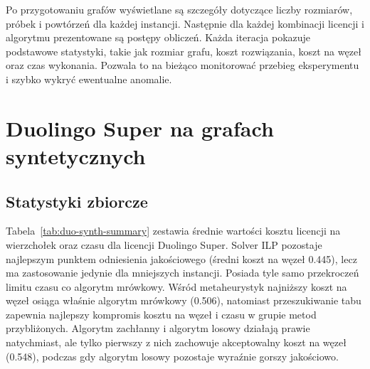 Po przygotowaniu grafów wyświetlane są szczegóły dotyczące liczby rozmiarów, próbek i powtórzeń dla każdej instancji. Następnie dla każdej kombinacji licencji i algorytmu prezentowane są postępy obliczeń. Każda iteracja pokazuje podstawowe statystyki, takie jak rozmiar grafu, koszt rozwiązania, koszt na węzeł oraz czas wykonania. Pozwala to na bieżąco monitorować przebieg eksperymentu i szybko wykryć ewentualne anomalie.

\section{Duolingo Super na grafach syntetycznych}

\subsection{Statystyki zbiorcze}
Tabela~\ref{tab:duo-synth-summary} zestawia średnie wartości kosztu licencji na wierzchołek oraz czasu dla licencji Duolingo Super. Solver ILP pozostaje najlepszym punktem odniesienia jakościowego (średni koszt na węzeł 0.445), lecz ma zastosowanie jedynie dla mniejszych instancji. Posiada tyle samo przekroczeń limitu czasu co algorytm mrówkowy. Wśród metaheurystyk najniższy koszt na węzeł osiąga właśnie algorytm mrówkowy (0.506), natomiast przeszukiwanie tabu zapewnia najlepszy kompromis kosztu na węzeł i czasu w grupie metod przybliżonych. Algorytm zachłanny i algorytm losowy działają prawie natychmiast, ale tylko pierwszy z nich zachowuje akceptowalny koszt na węzeł (0.548), podczas gdy algorytm losowy pozostaje wyraźnie gorszy jakościowo.

